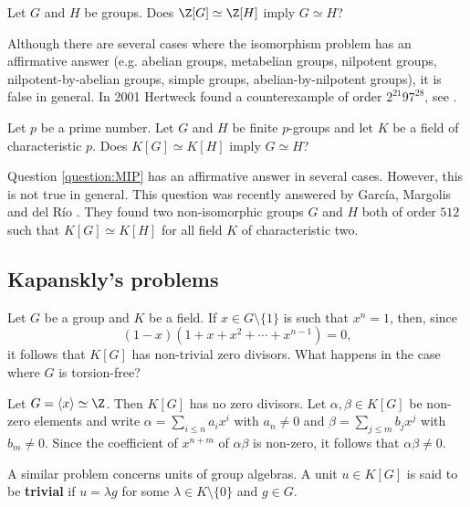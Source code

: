 \begin{question}
\label{question:IP}
    Let $G$ and $H$ be groups. Does $\Z[G]\simeq\Z[H]$ imply $G\simeq H$?
\end{question}   

Although there are several cases where 
the isomorphism problem has an affirmative answer (e.g. abelian groups, 
metabelian groups, nilpotent groups, nilpotent-by-abelian groups, simple groups, 
abelian-by-nilpotent groups), it is false in general. In 2001  
Hertweck found a counterexample of order $2^{21}97^{28}$, see \cite{MR1847590}.  

\begin{question}
\label{question:MIP}
    Let $p$ be a prime number. Let 
    $G$ and $H$ be finite $p$-groups and let $K$ be a field of characteristic $p$. 
    Does $K[G]\simeq K[H]$ imply $G\simeq H$?
\end{question}   

Question \ref{question:MIP} has an affirmative answer in several cases. However, 
this is not true in general. This question was recently answered by Garc\'ia, Margolis and
del R\'io \cite{MR4373245}. They found two non-isomorphic groups $G$ and $H$ both of order $512$ 
such that $K[G]\simeq K[H]$ for all field $K$ 
of characteristic two. 

\subsection{Kapanskly's problems}

Let $G$ be a group and $K$ be a field. If  
$x\in G\setminus\{1\}$ is such that $x^n=1$, then, since 
\[
(1-x)(1+x+x^2+\cdots+x^{n-1})=0, 
\] 
it follows that $K[G]$ has non-trivial zero divisors. What happens in the case
where $G$ is torsion-free?

\begin{example}
	\label{example:k[Z]}
	Let $G=\langle x\rangle\simeq\Z$. Then $K[G]$ has no zero divisors. 
	Let $\alpha,\beta\in K[G]$ be non-zero elements and write 
	$\alpha=\sum_{i\leq n}a_ix^i$ with $a_n\ne 0$ and $\beta=\sum_{j\leq m}b_jx^j$
	with $b_m\ne 0$. Since the coefficient of $x^{n+m}$ of $\alpha\beta$ is non-zero,
	it follows that 
	$\alpha\beta\ne 0$.
\end{example}

A similar problem concerns units of group algebras.  A unit $u\in K[G]$ is said
to be \textbf{trivial} if $u=\lambda g$ for some $\lambda\in K\setminus\{0\}$ and
$g\in G$.	


